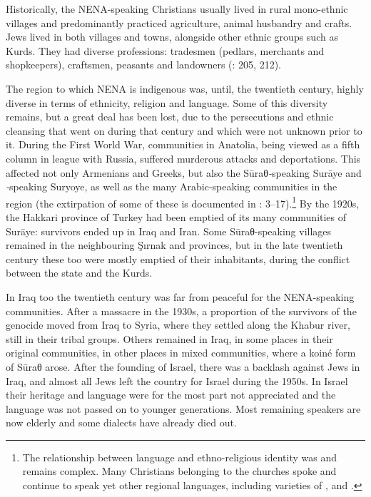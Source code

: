 \documentclass[output=paper]{langsci/langscibook}
\begin{document}
Historically, the NENA-speaking {Christians} usually lived in rural mono-ethnic villages and predominantly practiced agriculture, animal husbandry and crafts. {Jews} lived in both villages and towns, alongside other ethnic groups such as {Kurds}. They had diverse professions: tradesmen (pedlars, merchants and shopkeepers), craftsmen, peasants and landowners (\citealt{BrauerPatai1993}: 205, 212).

The region to which NENA is indigenous was, until, the twentieth century, highly diverse in terms of ethnicity, religion and language. Some of this diversity remains, but a great deal has been lost, due to the persecutions and ethnic cleansing that went on during that century and which were not unknown prior to it. During the First World War,  communities in {Anatolia}, being viewed as a fifth column in league with Russia, suffered murderous attacks and deportations. This affected not only Armenians and Greeks, but also the Sūraθ\textit{{}-}speaking Surāye and \textit{{}-}speaking Suryoye, as well as the many Arabic-speaking  communities in the region (the extirpation of some of these is documented in \citealt{Jastrow1978}: 3–17).\footnote{The relationship between language and ethno-religious {identity} was and remains complex. Many {Christians} belonging to the  churches spoke and continue to speak yet other regional languages, including varieties of ,  and .} By the 1920s, the Hakkari province of Turkey had been emptied of its many communities of Surāye: survivors ended up in Iraq and Iran. Some Sūraθ-speaking villages remained in the neighbouring Şırnak and  provinces, but in the late twentieth century these too were mostly emptied of their inhabitants, during the conflict between the  state and the {Kurds}.

In Iraq too the twentieth century was far from peaceful for the NENA-speaking communities. After a massacre in the 1930s, a proportion of the survivors of the genocide moved from Iraq to Syria, where they settled along the Khabur river, still in their tribal groups. Others remained in Iraq, in some places in their original communities, in other places in mixed communities, where a koiné form of Sūraθ arose. After the founding of Israel, there was a backlash against {Jews} in Iraq, and almost all {Jews} left the country for Israel during the 1950s. In Israel their heritage and language were for the most part not appreciated and the language was not passed on to younger generations. Most remaining speakers are now elderly and some dialects have already died out.
\end{document}
